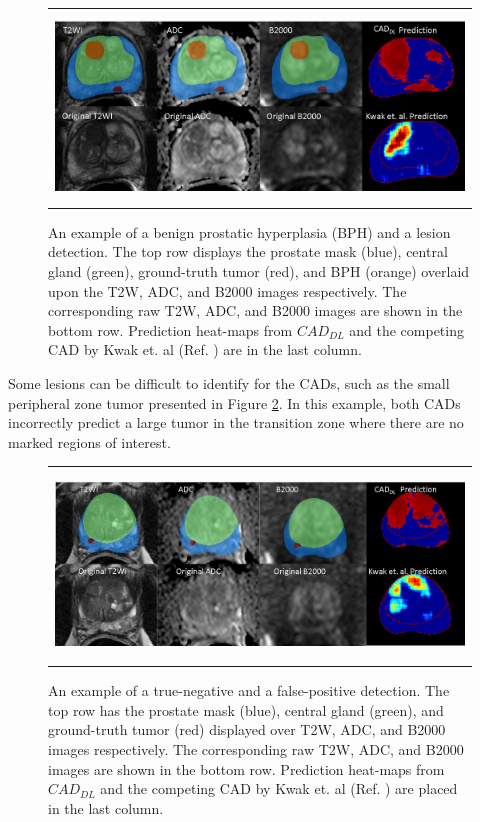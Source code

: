\begin{figure} [ht]
   \begin{center}
   \begin{tabular}{c}
   \includegraphics[height=5cm]{Figure9}
   \end{tabular}
   \end{center}
   \caption[Fig9]
   { \label{fig:9} 
An example of a benign prostatic hyperplasia (BPH) and a lesion detection. The top row displays the prostate mask (blue), central gland (green), ground-truth tumor (red), and BPH (orange) overlaid upon the T2W, ADC, and B2000 images respectively. The corresponding raw T2W, ADC, and B2000 images are shown in the bottom row. Prediction heat-maps from $CAD_{DL}$ and the competing CAD by Kwak et. al (Ref. ) are in the last column.}
   \end{figure}
Some lesions can be difficult to identify for the CADs, such as the small peripheral zone tumor presented in Figure \ref{fig:10}. In this example, both CADs incorrectly predict a large tumor in the transition zone where there are no marked regions of interest.   
\begin{figure} [ht]
   \begin{center}
   \begin{tabular}{c}
   \includegraphics[height=5cm]{Figure10}
   \end{tabular}
   \end{center}
   \caption[Fig10]
   { \label{fig:10} 
An example of a true-negative and a false-positive detection. The top row has the prostate mask (blue), central gland (green), and ground-truth tumor (red) displayed over T2W, ADC, and B2000 images respectively. The corresponding raw T2W, ADC, and B2000 images are shown in the bottom row. Prediction heat-maps from $CAD_{DL}$ and the competing CAD by Kwak et. al (Ref. ) are placed in the last column.}
   \end{figure}
